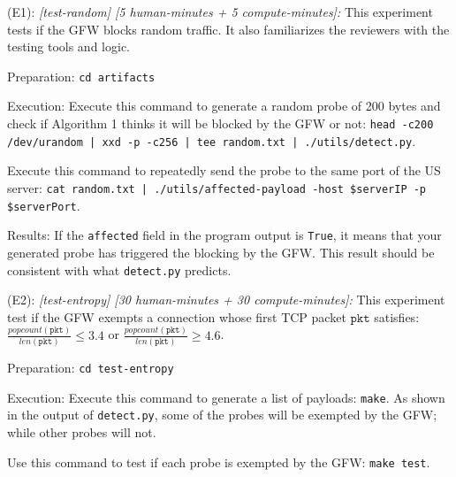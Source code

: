 \begin{compactdesc}

    \item[(E1):] \textit{[test-random] [5 human-minutes + 5 compute-minutes]:
    } This experiment tests if the GFW blocks random traffic.
    It also familiarizes the reviewers with the testing tools and logic.
    \begin{asparadesc}
        \item[Preparation:] \texttt{cd artifacts}
        \item[Execution:]  
        Execute this command to generate a random probe of 200 bytes and
        check if Algorithm 1 thinks it will be blocked by the GFW or not:
        \texttt{head -c200 /dev/urandom | xxd -p -c256 | tee random.txt | ./utils/detect.py}.
        
        Execute this command to repeatedly send the probe to the same port of the US server:
        \texttt{cat random.txt | ./utils/affected-payload -host \$serverIP -p \$serverPort}.

        \item[Results:] 
        If the \texttt{affected} field in the program output is \texttt{True},
        it means that your generated probe has triggered the blocking by the GFW. 
        This result should be consistent with what \texttt{detect.py} predicts.
    \end{asparadesc}

    \item[(E2):] \textit{[test-entropy] [30 human-minutes + 30 compute-minutes]:}
    This experiment test if the GFW exempts a connection whose
    first TCP packet $\mathtt{pkt}$ satisfies:
    $\frac{\mathit{popcount}(\mathtt{pkt})}{\mathit{len}(\mathtt{pkt})} \le 3.4$ or 
    $\frac{\mathit{popcount}(\mathtt{pkt})}{\mathit{len}(\mathtt{pkt})} \ge 4.6$. 

    \begin{asparadesc}
        \item[Preparation:] \texttt{cd test-entropy}

        \item[Execution:]
        Execute this command to generate a list of payloads: \texttt{make}. 
        As shown in the output of \texttt{detect.py},
        some of the probes will be exempted by the GFW; 
        while other probes will not.

        Use this command to test if each probe is exempted by the GFW:
        \texttt{make test}.


\end{asparadesc}
\end{compactdesc}

